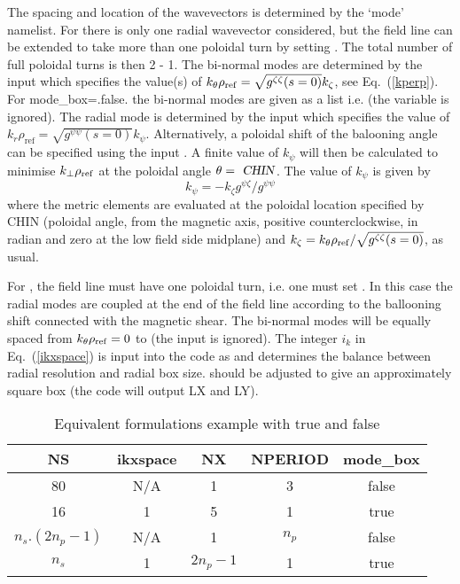 The spacing and location of the wavevectors is determined by the `mode' namelist.
For  there is only one radial wavevector considered, but the field line can be extended to 
take more than one poloidal turn by setting . The total number of full poloidal turns is then 2  - 1. 
The bi-normal modes are determined by the input  which specifies the value(s) of
$k_\theta\rho_{\rm ref}=\sqrt{g^{\zeta\zeta}(s=0)}k_\zeta$, see Eq.~(\ref{kperp}). For {mode_box=.false.} the bi-normal modes are given as a list i.e.
  (the variable  is ignored).
The radial mode is determined by the input  which specifies the value of $k_r\rho_\textrm{ref}=\sqrt{g^{\psi\psi}(s=0)}k_\psi$.
Alternatively, a poloidal shift of the balooning angle can be specified using the input . A finite value of $k_\psi$ will then be
calculated to minimise $k_\perp\rho_{\rm ref}$ at the poloidal angle $\theta = \name{CHIN}$. The value of $k_\psi$ is given by
$$k_\psi = - k_\zeta g^{\psi\zeta}/g^{\psi\psi}$$
where the metric elements are evaluated at the poloidal location specified by CHIN (poloidal angle, from the magnetic axis, positive counterclockwise, in radian and
zero at the low field side midplane) and $k_\zeta=k_\theta\rho_{\rm ref} / \sqrt{g^{\zeta\zeta}(s=0)}$, as usual.

For , the field line must have one poloidal turn, i.e. one must set . In this case 
the radial modes are coupled at the end of the field line according to the ballooning shift connected with the
magnetic shear.  
The bi-normal modes will be equally spaced from $k_\theta\rho_{\rm ref} =0$ to  (the  input is ignored).  
The integer $i_k$ in Eq.~(\ref{ikxspace}) is input into the code as  and determines the balance between radial 
resolution and radial box size.   should be adjusted to give an approximately square box (the code will output LX and LY).
\begin{table}[h!]
\begin{center}
\begin{tabular}{c|c|c|c|c}
 NS & ikxspace & NX & NPERIOD & mode_box \\
\hline
 80      &    N/A   &  1  &    3    & false    \\
 16      &     1    &  5  &    1    & true     \\ 
\hline
 $n_s.(2n_p-1)$ &    N/A   &  1  &    $n_p$    & false    \\
 $n_s$    &     1    & $2n_p-1$ &  1   & true   \\

\end{tabular}
\caption{Equivalent formulations example with  true and false}
\end{center}
\end{table}\\


